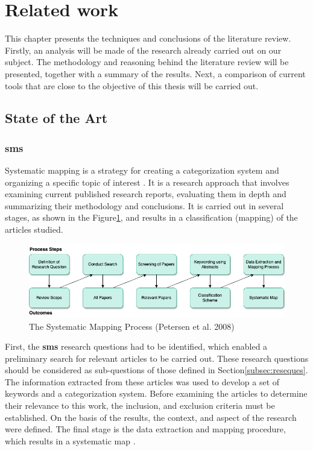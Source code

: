 \section{Related work\label{sec:relwork}}
This chapter presents the techniques and conclusions of the literature review. Firstly, an analysis will be made of the research already carried out on our subject. The methodology and reasoning behind the literature review will be presented, together with a summary of the results. Next, a comparison of current tools that are close to the objective of this thesis will be carried out.\\

    \subsection{State of the Art}
        \subsubsection{\acrfull{sms}}
        Systematic mapping is a strategy for creating a categorization system and organizing a specific topic of interest \cite{petersen2008systematic}. It is a research approach that involves examining current published research reports, evaluating them in depth and summarizing their methodology and conclusions. It is carried out in several stages, as shown in the Figure\ref{fig:SysMapProcess}, and results in a classification (mapping) of the articles studied.\\

        \begin{figure}[h]
            \centering
            \includegraphics[scale=0.6]{images/RelatedWork-SysMapProcess.drawio.png}
            \caption{\label{fig:SysMapProcess}  The Systematic Mapping Process (Petersen et al. 2008) \cite{petersen2008systematic}}
        \end{figure}

        First, the \textbf{\acrshort{sms}} research questions had to be identified, which enabled a preliminary search for relevant articles to be carried out. These research questions should be considered as sub-questions of those defined in Section\ref{subsec:reseques}. The information extracted from these articles was used to develop a set of keywords and a categorization system. Before examining the articles to determine their relevance to this work, the inclusion, and exclusion criteria must be established. On the basis of the results, the context, and aspect of the research were defined. The final stage is the data extraction and mapping procedure, which results in a systematic map \cite{petersen2008systematic, petersen2015guidelines}.\\

